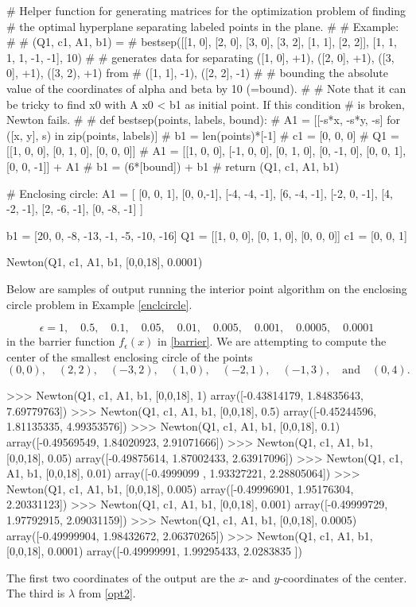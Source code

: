 \documentclass{article}
\begin{document}
\begin{sage}
# Helper function for generating matrices for the optimization problem of finding
# the optimal hyperplane separating labeled points in the plane.
#
# Example:
#
# (Q1, c1, A1, b1) =
# bestsep([[1, 0], [2, 0], [3, 0], [3, 2],  [1, 1], [2, 2]], [1, 1, 1, 1, -1, -1], 10)
#
# generates data for separating ([1, 0], +1), ([2, 0], +1), ([3, 0], +1), ([3, 2), +1) from
# ([1, 1], -1), ([2, 2], -1)
#
# bounding the absolute value of the coordinates of alpha and beta by 10 (=bound).
#
# Note that it can be tricky to find x0 with A x0 < b1 as initial point. If this condition
# is broken, Newton fails.
#
# def bestsep(points, labels, bound):
#     A1 = [[-s*x, -s*y, -s] for ([x, y], s) in zip(points, labels)]
#     b1 = len(points)*[-1]
#     c1 = [0, 0, 0]
#     Q1 = [[1, 0, 0], [0, 1, 0], [0, 0, 0]]
#     A1 = [[1, 0, 0], [-1, 0, 0], [0, 1, 0], [0, -1, 0], [0, 0, 1], [0, 0, -1]] + A1
#     b1 = (6*[bound]) + b1
#     return (Q1, c1, A1, b1)
    


# Enclosing circle:
A1 = [
    [0, 0, 1],
    [0, 0,-1],
    [-4, -4, -1],
    [6, -4, -1],
    [-2, 0, -1],
    [4, -2, -1],
    [2, -6, -1],
    [0, -8, -1]
]

b1 = [20, 0, -8, -13, -1, -5, -10, -16]
Q1 = [[1, 0, 0], [0, 1, 0], [0, 0, 0]]
c1 = [0, 0, 1]
  
Newton(Q1, c1, A1, b1, [0,0,18], 0.0001)
\end{sage}


\begin{example}

  Below are samples of output running the interior point algorithm on the enclosing circle problem in Example \ref{enclcircle}.

  $$
  \epsilon = 1,\quad 0.5, \quad 0.1, \quad 0.05, \quad 0.01, \quad 0.005, \quad 0.001, \quad 0.0005, \quad 0.0001
  $$
  in the barrier function $f_\epsilon(x)$ in \eqref{barrier}. We are attempting to compute the center
  of the smallest enclosing circle of the points
  $$
  (0, 0), \quad (2,2), \quad (-3, 2), \quad (1, 0), \quad (-2, 1), \quad (-1, 3), \quad\text{and}\quad
  (0, 4).
  $$
\begin{code}
>>> Newton(Q1, c1, A1, b1, [0,0,18], 1)
array([-0.43814179,  1.84835643,  7.69779763])
>>> Newton(Q1, c1, A1, b1, [0,0,18], 0.5)
array([-0.45244596,  1.81135335,  4.99353576])
>>> Newton(Q1, c1, A1, b1, [0,0,18], 0.1)
array([-0.49569549,  1.84020923,  2.91071666])
>>> Newton(Q1, c1, A1, b1, [0,0,18], 0.05)
array([-0.49875614,  1.87002433,  2.63917096])
>>> Newton(Q1, c1, A1, b1, [0,0,18], 0.01)
array([-0.4999099 ,  1.93327221,  2.28805064])
>>> Newton(Q1, c1, A1, b1, [0,0,18], 0.005)
array([-0.49996901,  1.95176304,  2.20331123])
>>> Newton(Q1, c1, A1, b1, [0,0,18], 0.001)
array([-0.49999729,  1.97792915,  2.09031159])
>>> Newton(Q1, c1, A1, b1, [0,0,18], 0.0005)
array([-0.49999904,  1.98432672,  2.06370265])
>>> Newton(Q1, c1, A1, b1, [0,0,18], 0.0001)
array([-0.49999991,  1.99295433,  2.0283835 ])
\end{code}
The first two coordinates of the output are the $x$- and $y$-coordinates of the center. The third
is $\lambda$ from \eqref{opt2}. 
\end{example}
\end{document}
